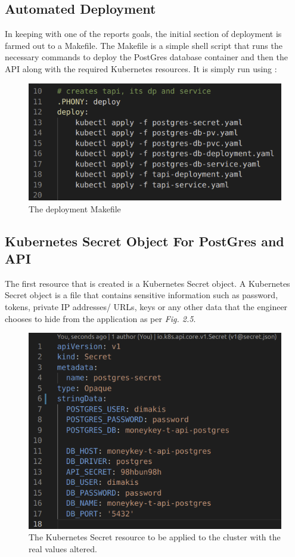 \begin{flushleft}
    \subsection{Automated Deployment}
    In keeping with one of the reports goals, the initial section of deployment is farmed out to a Makefile. The Makefile is a simple shell script that runs the necessary commands to
    deploy the PostGres database container and then the API along with the required Kubernetes resources. It is simply run using : \newline
    \begin{figure} [ht]
        \begin{center}
            \includegraphics[width=.8\textwidth]{figures/deployment-makefile.png}
            \caption{The deployment Makefile}
            \label{fig: 2.4}
        \end{center}
    \end{figure}
    \pagebreak
    \subsection{Kubernetes Secret Object For PostGres and API}
    The first resource that is created is a Kubernetes Secret object. A Kubernetes Secret object is a file that contains sensitive information such as password, tokens, private
    IP addresses/ URLs, keys or any other data that the engineer chooses to hide from the application \autocite{Secrets} as per \emph{Fig. 2.5}.
    \begin{figure} [ht]
        \begin{center}
            \includegraphics[width=.6\textwidth]{figures/deployment-secret.png}
            \caption{The Kubernetes Secret resource to be applied to the cluster with the real values altered.}
            \label{fig: 2.5}


\end{center}
\end{figure}
\end{flushleft}
